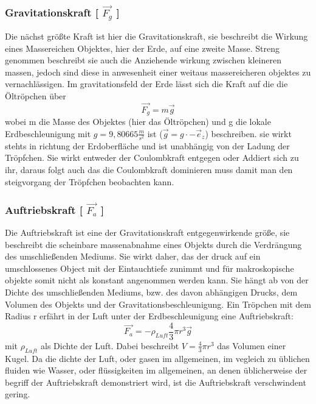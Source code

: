 \documentclass{scrartcl}
\begin{document}
			\subsubsection{Gravitationskraft [ $\vec{F_g}$ ]}
			Die nächst größte Kraft ist hier die Gravitationskraft, sie beschreibt die Wirkung eines Massereichen Objektes,
			hier der Erde, auf eine zweite Masse. Streng genommen beschreibt sie auch die Anziehende wirkung zwischen kleineren
			massen, jedoch sind diese in anwesenheit einer weitaus massereicheren objektes zu vernachlässigen.
			Im gravitationsfeld der Erde lässt sich die Kraft auf die die Öltröpchen über
			\begin{equation}
				\vec{F_g} = m\vec{g}
			\end{equation}
			wobei m die Masse des Objektes (hier das Öltröpchen) und g die lokale Erdbeschleunigung mit $g = 9,80665 \frac{m}{s^2}$ ist ($\vec{g} = g \cdot -\vec{e}_z$) beschreiben.
			sie wirkt stehts in richtung der Erdoberfläche und ist unabhängig von der Ladung der Tröpfchen. Sie wirkt entweder
			der Coulombkraft entgegen oder Addiert sich zu ihr, daraus folgt auch das die Coulombkraft dominieren muss damit man den
			steigvorgang der Tröpfchen beobachten kann.
		
			\subsubsection{Auftriebskraft [ $\vec{F_a}$ ]}
			Die Auftriebskraft ist eine der Gravitationskraft entgegenwirkende größe, sie beschreibt die scheinbare
			massenabnahme eines Objekts durch die Verdrängung des umschließenden Mediums. Sie wirkt daher, das der
			druck auf ein umschlossenes Object mit der Eintauchtiefe zunimmt und für makroskopische objekte somit
			nicht als konstant angenommen werden kann. Sie hängt ab von der Dichte des umschließenden Mediums, bzw. des davon abhängigen Drucks,
			dem Volumen des Objekts und der Gravitationsbeschleunigung.
			Ein Tröpchen mit dem Radius r erfährt in der Luft unter der Erdbeschleunigung eine Auftriebskraft:
			\begin{equation}
				\vec{F_a} = - \rho_{Luft} \frac{4}{3} \pi r^3 \vec{g}
			\end{equation}
			mit $\rho_{Luft}$ als Dichte der Luft. Dabei beschreibt $V=\frac{4}{3} \pi r^3$ das Volumen einer Kugel.
			Da die dichte der Luft, oder gasen im allgemeinen, im vegleich zu üblichen fluiden wie Wasser, oder flüssigkeiten im allgemeinen, an denen üblicherweise
			der begriff der Auftriebskraft demonstriert wird, ist die Auftriebskraft verschwindent gering.
		
\end{document}
